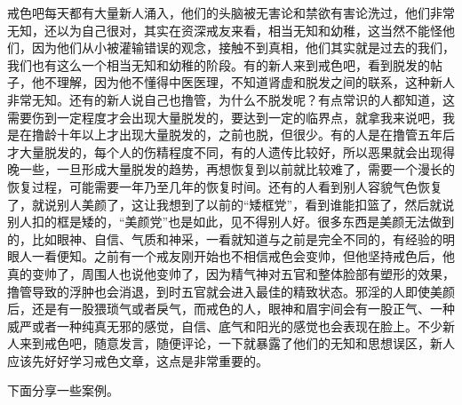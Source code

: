 戒色吧每天都有大量新人涌入，他们的头脑被无害论和禁欲有害论洗过，他们非常无知，还以为自己很对，其实在资深戒友来看，相当无知和幼稚，这当然不能怪他们，因为他们从小被灌输错误的观念，接触不到真相，他们其实就是过去的我们，我们也有这么一个相当无知和幼稚的阶段。有的新人来到戒色吧，看到脱发的帖子，他不理解，因为他不懂得中医医理，不知道肾虚和脱发之间的联系，这种新人非常无知。还有的新人说自己也撸管，为什么不脱发呢？有点常识的人都知道，这需要伤到一定程度才会出现大量脱发的，要达到一定的临界点，就拿我来说吧，我是在撸龄十年以上才出现大量脱发的，之前也脱，但很少。有的人是在撸管五年后才大量脱发的，每个人的伤精程度不同，有的人遗传比较好，所以恶果就会出现得晚一些，一旦形成大量脱发的趋势，再想恢复到以前就比较难了，需要一个漫长的恢复过程，可能需要一年乃至几年的恢复时间。还有的人看到别人容貌气色恢复了，就说别人美颜了，这让我想到了以前的“矮框党”，看到谁能扣篮了，然后就说别人扣的框是矮的，“美颜党”也是如此，见不得别人好。很多东西是美颜无法做到的，比如眼神、自信、气质和神采，一看就知道与之前是完全不同的，有经验的明眼人一看便知。之前有一个戒友刚开始也不相信戒色会变帅，但他坚持戒色后，他真的变帅了，周围人也说他变帅了，因为精气神对五官和整体脸部有塑形的效果，撸管导致的浮肿也会消退，到时五官就会进入最佳的精致状态。邪淫的人即使美颜后，还是有一股猥琐气或者戾气，而戒色的人，眼神和眉宇间会有一股正气、一种威严或者一种纯真无邪的感觉，自信、底气和阳光的感觉也会表现在脸上。不少新人来到戒色吧，随意发言，随便评论，一下就暴露了他们的无知和思想误区，新人应该先好好学习戒色文章，这点是非常重要的。

下面分享一些案例。

